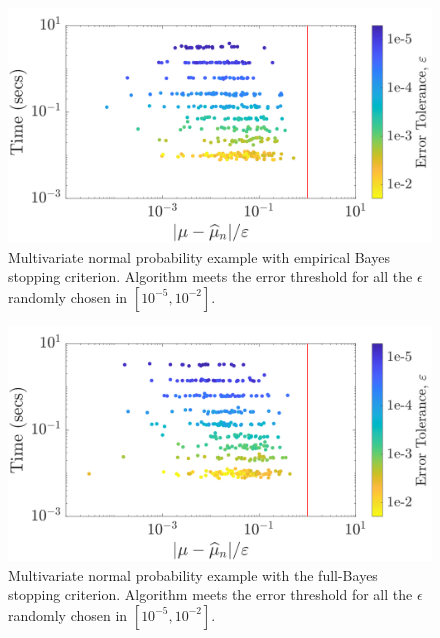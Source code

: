\documentclass[graybox,footinfo]{svmult}
\begin{document}
\begin{figure}
\centering
\includegraphics[width=0.95\linewidth]{"figures/Sobol/Sobol_MVN_guaranteed_time_MLE__d2_r1_2019-Sep-1"}
\caption[Sobol: MVN guaranteed:EB]{Multivariate normal probability example with empirical Bayes stopping criterion.  Algorithm meets the error threshold for all the $\epsilon$ randomly chosen in $[10^{-5}, 10^{-2}]$.}

\label{FJ:fig:Sobol-mvn-guaranteed-EB}
\end{figure}
\begin{figure}
\centering
\includegraphics[width=0.95\linewidth]{"figures/Sobol/Sobol_MVN_guaranteed_time_full__d2_r1_2019-Sep-1"}
\caption[Sobol: MVN guaranteed: Full Bayes]{Multivariate normal probability example with the full-Bayes stopping criterion. Algorithm meets the error threshold for all the $\epsilon$ randomly chosen in $[10^{-5}, 10^{-2}]$.}
\label{FJ:fig:Sobol-mvn-guaranteed-FB}
\end{figure}
\end{document}
